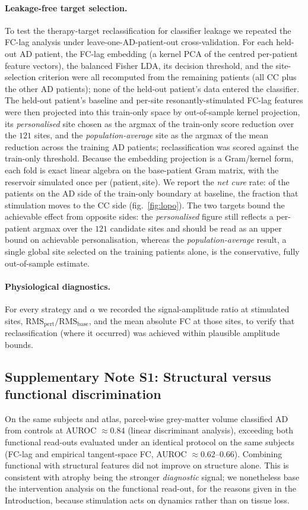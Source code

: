 \documentclass[11pt]{article}
\begin{document}
\paragraph{Leakage-free target selection.}
To test the therapy-target reclassification for classifier leakage we repeated
the FC-lag analysis under leave-one-AD-patient-out cross-validation. For each
held-out AD patient, the FC-lag embedding (a kernel PCA of the centred per-patient
feature vectors), the balanced Fisher LDA, its decision threshold, and the
site-selection criterion were all recomputed from the remaining patients (all CC
plus the other AD patients); none of the held-out patient's data entered the
classifier. The held-out patient's baseline and per-site resonantly-stimulated
FC-lag features were then projected into this train-only space by out-of-sample
kernel projection, its \emph{personalised} site chosen as the argmax of the
train-only score reduction over the $121$ sites, and the \emph{population-average}
site as the argmax of the mean reduction across the training AD patients;
reclassification was scored against the train-only threshold. Because the
embedding projection is a Gram/kernel form, each fold is exact linear algebra on
the base-patient Gram matrix, with the reservoir simulated once per
(patient,\,site). We report the \emph{net cure} rate: of the patients on the AD
side of the train-only boundary at baseline, the fraction that stimulation moves
to the CC side (fig.~\ref{fig:lopo}). The two targets bound the achievable
effect from opposite sides: the \emph{personalised} figure still reflects a
per-patient argmax over the $121$ candidate sites and should be read as an upper
bound on achievable personalisation, whereas the \emph{population-average}
result, a single global site selected on the training patients alone, is the
conservative, fully out-of-sample estimate.

\paragraph{Physiological diagnostics.}
For every strategy and $\alpha$ we recorded the signal-amplitude ratio at
stimulated sites, $\mathrm{RMS}_{\mathrm{pert}}/\mathrm{RMS}_{\mathrm{base}}$,
and the mean absolute FC at those sites, to verify that reclassification (where
it occurred) was achieved within plausible amplitude bounds.


\subsection*{Supplementary Note S1: Structural versus functional discrimination}
On the same subjects and atlas, parcel-wise grey-matter volume classified AD from
controls at AUROC $\approx0.84$ (linear discriminant analysis), exceeding both
functional read-outs evaluated under an identical protocol on the same subjects
(FC-lag and empirical tangent-space FC, AUROC
$\approx0.62$--$0.66$). Combining functional with
structural features did not improve on structure alone. This is consistent with
atrophy being the stronger \emph{diagnostic} signal; we nonetheless base the
intervention analysis on the functional read-out, for the reasons given in the
Introduction, because stimulation acts on dynamics rather than on tissue loss.
\end{document}
